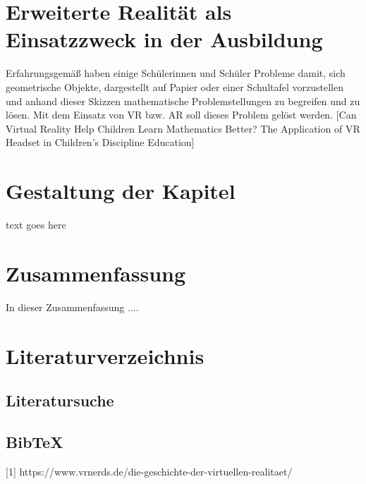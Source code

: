 \documentclass[deutsch]{llncs}
\begin{document}
\section{Erweiterte Realität als Einsatzzweck in der Ausbildung}
\label{sec:typo}
Erfahrungsgemäß haben einige Schülerinnen und Schüler Probleme damit, sich geometrische Objekte, dargestellt auf Papier oder einer Schultafel vorzustellen und anhand dieser Skizzen mathematische Problemstellungen zu begreifen und zu lösen. Mit dem Einsatz von VR bzw. AR soll dieses Problem gelöst werden.
[Can Virtual Reality Help Children Learn Mathematics Better? The Application of VR Headset in Children’s Discipline Education]

\section{Gestaltung der Kapitel}
\label{sec:typo}

text goes here
\section{Zusammenfassung}
\label{sec:typo}
In dieser Zusammenfassung .... 

\section{Literaturverzeichnis}
\label{sec:bib}

\subsection{Literatursuche}
\label{subsec:search}


\subsection{BibTeX}
\label{subsec:bibtex}
[1] https://www.vrnerds.de/die-geschichte-der-virtuellen-realitaet/


\printbibliography
\end{document}

